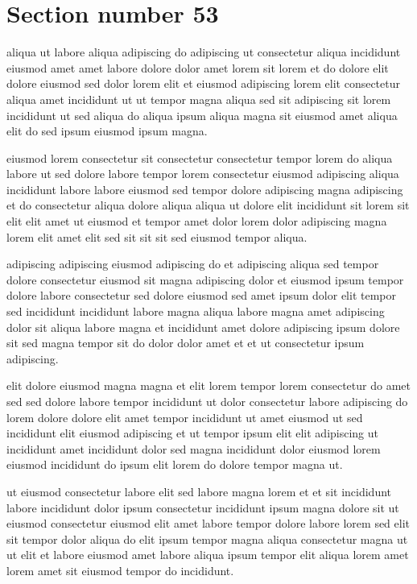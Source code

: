 \documentclass{article}
\begin{document}
\section{Section number 53}\label{sec:53}
aliqua ut labore aliqua adipiscing do adipiscing ut consectetur aliqua incididunt eiusmod amet amet labore dolore dolor amet lorem sit lorem et do dolore elit dolore eiusmod sed dolor lorem elit et eiusmod adipiscing lorem elit consectetur aliqua amet incididunt ut ut tempor magna aliqua sed sit adipiscing sit lorem incididunt ut sed aliqua do aliqua ipsum aliqua magna sit eiusmod amet aliqua elit do sed ipsum eiusmod ipsum magna.

eiusmod lorem consectetur sit consectetur consectetur tempor lorem do aliqua labore ut sed dolore labore tempor lorem consectetur eiusmod adipiscing aliqua incididunt labore labore eiusmod sed tempor dolore adipiscing magna adipiscing et do consectetur aliqua dolore aliqua aliqua ut dolore elit incididunt sit lorem sit elit elit amet ut eiusmod et tempor amet dolor lorem dolor adipiscing magna lorem elit amet elit sed sit sit sit sed eiusmod tempor aliqua.

adipiscing adipiscing eiusmod adipiscing do et adipiscing aliqua sed tempor dolore consectetur eiusmod sit magna adipiscing dolor et eiusmod ipsum tempor dolore labore consectetur sed dolore eiusmod sed amet ipsum dolor elit tempor sed incididunt incididunt labore magna aliqua labore magna amet adipiscing dolor sit aliqua labore magna et incididunt amet dolore adipiscing ipsum dolore sit sed magna tempor sit do dolor dolor amet et et ut consectetur ipsum adipiscing.

elit dolore eiusmod magna magna et elit lorem tempor lorem consectetur do amet sed sed dolore labore tempor incididunt ut dolor consectetur labore adipiscing do lorem dolore dolore elit amet tempor incididunt ut amet eiusmod ut sed incididunt elit eiusmod adipiscing et ut tempor ipsum elit elit adipiscing ut incididunt amet incididunt dolor sed magna incididunt dolor eiusmod lorem eiusmod incididunt do ipsum elit lorem do dolore tempor magna ut.

ut eiusmod consectetur labore elit sed labore magna lorem et et sit incididunt labore incididunt dolor ipsum consectetur incididunt ipsum magna dolore sit ut eiusmod consectetur eiusmod elit amet labore tempor dolore labore lorem sed elit sit tempor dolor aliqua do elit ipsum tempor magna aliqua consectetur magna ut ut elit et labore eiusmod amet labore aliqua ipsum tempor elit aliqua lorem amet lorem amet sit eiusmod tempor do incididunt.
\end{document}
